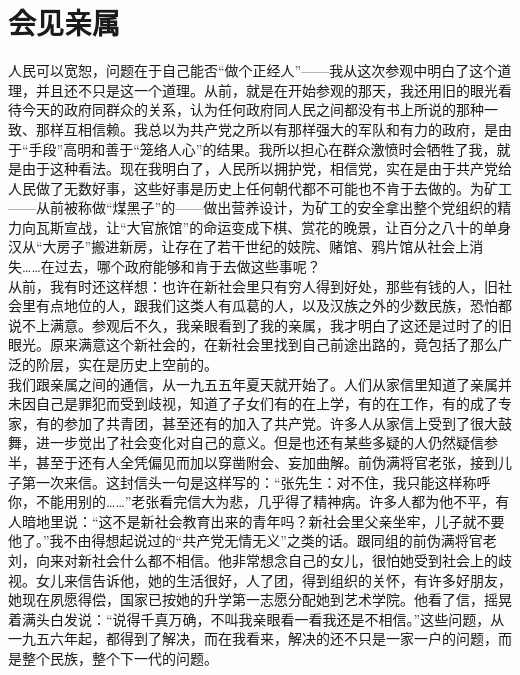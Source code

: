 \fancyhead[RO]{\thepage} %
\fancyhead[LE]{\thepage} %
\chapter*{会见亲属}
人民可以宽恕，问题在于自己能否“做个正经人”——我从这次参观中明白了这个道理，并且还不只是这一个道理。从前，就是在开始参观的那天，我还用旧的眼光看待今天的政府同群众的关系，认为任何政府同人民之间都没有书上所说的那种一致、那样互相信赖。我总以为共产党之所以有那样强大的军队和有力的政府，是由于“手段”高明和善于“笼络人心”的结果。我所以担心在群众激愤时会牺牲了我，就是由于这种看法。现在我明白了，人民所以拥护党，相信党，实在是由于共产党给人民做了无数好事，这些好事是历史上任何朝代都不可能也不肯于去做的。为矿工——从前被称做“煤黑子”的——做出营养设计，为矿工的安全拿出整个党组织的精力向瓦斯宣战，让“大官旅馆”的命运变成下棋、赏花的晚景，让百分之八十的单身汉从“大房子”搬进新房，让存在了若干世纪的妓院、赌馆、鸦片馆从社会上消失……在过去，哪个政府能够和肯于去做这些事呢？　\\

从前，我有时还这样想：也许在新社会里只有穷人得到好处，那些有钱的人，旧社会里有点地位的人，跟我们这类人有瓜葛的人，以及汉族之外的少数民族，恐怕都说不上满意。参观后不久，我亲眼看到了我的亲属，我才明白了这还是过时了的旧眼光。原来满意这个新社会的，在新社会里找到自己前途出路的，竟包括了那么广泛的阶层，实在是历史上空前的。\\

我们跟亲属之间的通信，从一九五五年夏天就开始了。人们从家信里知道了亲属并未因自己是罪犯而受到歧视，知道了子女们有的在上学，有的在工作，有的成了专家，有的参加了共青团，甚至还有的加入了共产党。许多人从家信上受到了很大鼓舞，进一步觉出了社会变化对自己的意义。但是也还有某些多疑的人仍然疑信参半，甚至于还有人全凭偏见而加以穿凿附会、妄加曲解。前伪满将官老张，接到儿子第一次来信。这封信头一句是这样写的：“张先生：对不住，我只能这样称呼你，不能用别的……”老张看完信大为悲，几乎得了精神病。许多人都为他不平，有人暗地里说：“这不是新社会教育出来的青年吗？新社会里父亲坐牢，儿子就不要他了。”我不由得想起说过的“共产党无情无义”之类的话。跟同组的前伪满将官老刘，向来对新社会什么都不相信。他非常想念自己的女儿，很怕她受到社会上的歧视。女儿来信告诉他，她的生活很好，人了团，得到组织的关怀，有许多好朋友，她现在夙愿得偿，国家已按她的升学第一志愿分配她到艺术学院。他看了信，摇晃着满头白发说：“说得千真万确，不叫我亲眼看一看我还是不相信。”这些问题，从一九五六年起，都得到了解决，而在我看来，解决的还不只是一家一户的问题，而是整个民族，整个下一代的问题。\\

